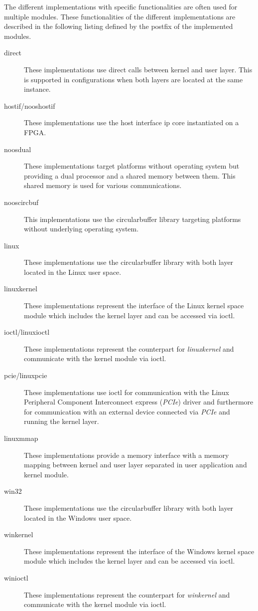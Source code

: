 The different implementations with specific functionalities are often used for multiple modules.
These functionalities of the different implementations are described in the following listing defined by the postfix of the implemented modules.

\begin{description}
    \item[direct] These implementations use direct calls between kernel and user layer.
    This is supported in configurations when both layers are located at the same instance.
    \item[hostif/nooshostif] These implementations use the host interface ip core instantiated on a FPGA.
    \item[noosdual] These implementations target platforms without operating system but providing a dual processor and a shared memory between them.
    This shared memory is used for various communications.
    \item[nooscircbuf] This implementations use the circularbuffer library targeting platforms without underlying operating system.
    \item[linux] These implementations use the circularbuffer library with both layer located in the Linux user space.
    \item[linuxkernel] These implementations represent the interface of the Linux kernel space module which includes the kernel layer and can be accessed via ioctl.
    \item[ioctl/linuxioctl] These implementations represent the counterpart for \emph{linuxkernel} and communicate with the kernel module via ioctl.
    \item[pcie/linuxpcie] These implementations use ioctl for communication with the Linux Peripheral Component Interconnect express (\emph{PCIe}) driver and furthermore for communication with an external device connected via \emph{PCIe} and running the kernel layer.
    \item[linuxmmap] These implementations provide a memory interface with a memory mapping between kernel and user layer separated in user application and kernel module.
    \item[win32] These implementations use the circularbuffer library with both layer located in the Windows user space.
    \item[winkernel] These implementations represent the interface of the Windows kernel space module which includes the kernel layer and can be accessed via ioctl.
    \item[winioctl] These implementations represent the counterpart for \emph{winkernel} and communicate with the kernel module via ioctl.

\end{description}
